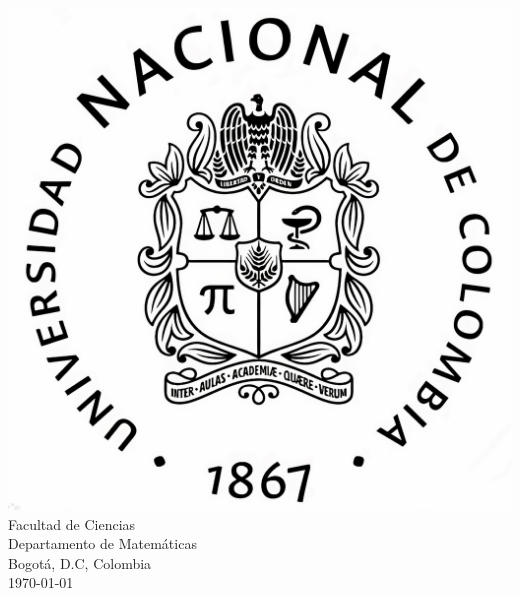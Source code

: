 \documentclass[12pt,a4paper]{book}
\begin{document}
\renewcommand{\contentsname}{\vspace{0cm} Contenido \vspace{-2cm}}
\begin{titlepage}
\vspace*{2cm}
\noindent
{}

\vspace*{5cm}
\begin{minipage}{\linewidth}

\centering  \scshape \printauthor
\vspace*{5cm}

\includegraphics[scale=0.1]{Logos/logo_un.jpg}\\
\fontsize{13pt}{13pt}\selectfont  Facultad de Ciencias\\
\vspace{0.1cm}
Departamento de Matemáticas\\
\vspace{0.1cm}
Bogotá, D.C, Colombia\\
\vspace{0.1cm}
\today
\end{minipage}
\end{titlepage}


\newpage


\end{document}
